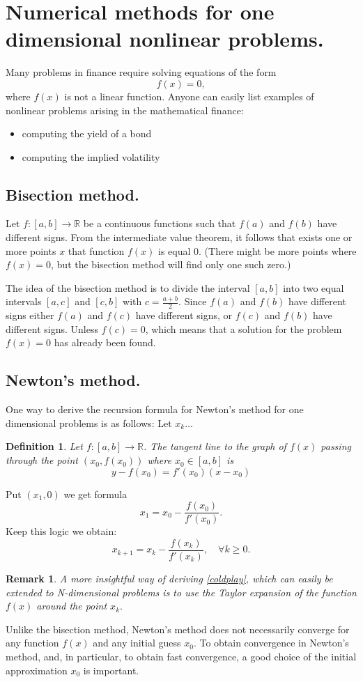 \documentclass{book}
\newtheorem{definition}{Definition}[section]
\newtheorem{remark}{Remark}[section]
\begin{document}
\section{Numerical methods for one dimensional nonlinear problems.}
Many problems in finance require solving equations of the form
$$
f(x)=0,
$$
where $f(x)$ is not a linear function. Anyone can easily list examples of nonlinear problems arising in the mathematical finance:
\begin{itemize}
\item computing the yield of a bond
\item computing the implied volatility
\end{itemize}
\subsection{Bisection method.}
Let $f:[a,b]\to\mathbb{R}$ be a continuous functions such that $f(a)$ and $f(b)$ have different signs. From the intermediate value theorem, it follows that exists one or more points $x$ that function $f(x)$ is equal $0$. (There might be more points where $f(x)=0$, but the bisection method will find only one such zero.)

The idea of the bisection method is to divide the interval $[a,b]$ into two equal intervals $[a,c]$ and $[c,b]$ with $c=\frac{a+b}{2}.$ Since $f(a)$ and $f(b)$ have different signs either $f(a)$ and $f(c)$ have different signs, or $f(c)$ and $f(b)$ have different signs. Unless $f(c)=0$, which means that a solution for the problem $f(x)=0$ has already been found.   
\subsection{Newton's method.} 
One way to derive the recursion formula for Newton's method for one dimensional problems is as follows:
Let $x_{k}\dots$
\begin{definition}
Let $f:[a,b]\to\mathbb{R}$. The tangent line to the graph of $f(x)$ passing through the point $(x_{0},f(x_{0}))$ where $x_{0}\in[a,b]$ is
$$
y-f(x_{0})=f'(x_{0})(x-x_{0})
$$  
\end{definition}
Put $(x_{1},0)$ we get formula
$$
x_{1}=x_{0}-\frac{f(x_{0})}{f'(x_{0})}.
$$
Keep this logic we obtain:
\begin{equation}
\label{coldplay}
x_{k+1}=x_{k}-\frac{f(x_{k})}{f'(x_{k})}, \quad \forall k\geq 0. 
\end{equation}


\begin{remark}
A more insightful way of deriving \eqref{coldplay}, which can easily be extended to N-dimensional problems is to use the Taylor expansion of the function $f(x)$ around the point $x_{k}.$ 
\end{remark}
Unlike the bisection method, Newton's method does not necessarily converge for any function $f(x)$ and any initial guess $x_{0}.$ To obtain convergence in Newton's method, and, in particular, to obtain fast convergence, a good choice of the initial approximation $x_{0}$ is important.
\end{document}
